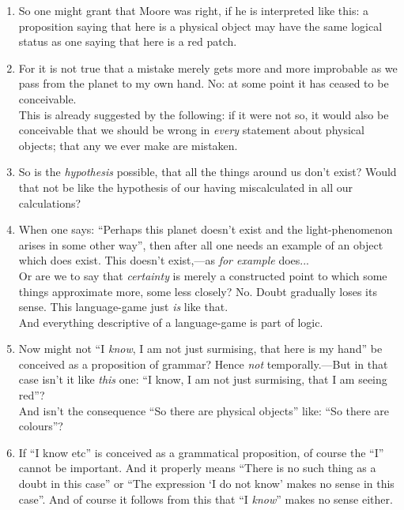 \documentclass{book}
\begin{document}
\begin{enumerate}
\item
So one might grant that Moore was right, if he is interpreted like this: a
proposition saying that here is a physical object may have the same logical
status as one saying that here is a red patch.

\item
For it is not true that a mistake merely gets more and more improbable as we
pass from the planet to my own hand. No: at some point it has ceased to be
conceivable. \\
This is already suggested by the following: if it were not so, it would also be
conceivable that we should be wrong in \emph{every} statement about physical
objects; that any we ever make are mistaken.

\item
So is the \emph{hypothesis} possible, that all the things around us don't
exist? Would that not be like the hypothesis of our having miscalculated in all
our calculations?

\item
When one says: ``Perhaps this planet doesn't exist and the light-phenomenon
arises in some other way'', then after all one needs an example of an object
which does exist. This doesn't exist,---as \emph{for example} does... \\
Or are we to say that \emph{certainty} is merely a constructed point to which
some things approximate more, some less closely? No. Doubt gradually loses its
sense. This language-game just \emph{is} like that. \\ 
And everything descriptive of a language-game is part of logic.

\item
Now might not ``I \emph{know}, I am not just surmising, that here is my hand''
be conceived as a proposition of grammar? Hence \emph{not} temporally.---But in
that case isn't it like \emph{this} one: ``I know, I am not just surmising,
that I am seeing red''? \\
And isn't the consequence ``So there are physical objects'' like: ``So there
are colours''?

\item
If ``I know etc'' is conceived as a grammatical proposition, of course the
``I'' cannot be important. And it properly means ``There is no such thing as a
doubt in this case'' or ``The expression `I do not know' makes no sense in this
case''. And of course it follows from this that ``I \emph{know}'' makes no
sense either.


\end{enumerate}
\end{document}
